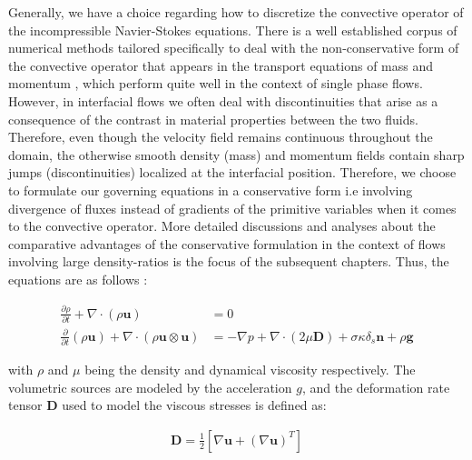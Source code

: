 Generally, we have a choice regarding how to discretize the convective operator
of the incompressible Navier-Stokes equations. There is a well established corpus of 
numerical methods tailored specifically to deal with the non-conservative 
 form of the convective 
operator that appears in the transport equations of mass and momentum 
, which perform quite well in the context of single phase flows.
However, in interfacial flows we often deal with discontinuities that arise as a consequence
of the contrast in material properties between the two fluids. Therefore, even though the velocity field
remains continuous throughout the domain, the otherwise smooth density (mass) and momentum fields 
contain sharp jumps (discontinuities) localized at the interfacial position.     
Therefore, we choose to formulate our governing equations in a conservative form i.e involving divergence of fluxes instead of gradients of the primitive variables when it comes to the convective operator. More detailed discussions and analyses about the comparative advantages of the conservative formulation in the context of flows involving large density-ratios is the focus of the subsequent chapters. Thus, the equations are as follows :  




\begin{align} 
	\frac{\partial \rho}{\partial t} + \nabla\cdot \left(\rho\boldsymbol{u}\right) &= 0 \label{mass} \\
	\frac{\partial}{\partial t} \left(\rho\boldsymbol{u}\right) + \nabla \cdot \left(\rho\boldsymbol{u}\otimes\boldsymbol{u}\right)  &= -\nabla p + \nabla \cdot \left(2 \mu \boldsymbol{D}\right) + \sigma \kappa \delta_{s}\boldsymbol{n} + \rho \boldsymbol{g}
\label{nseqn}
\end{align}


with $\rho$ and $\mu$ being the density and dynamical viscosity respectively. 
The volumetric sources are modeled by the acceleration $g$, and the 
deformation rate tensor $\boldsymbol{D}$ used to model the viscous stresses is defined as:  

\begin{align}
	\boldsymbol{D} = \frac{1}{2}\left[\nabla \boldsymbol{u} + \left(\nabla \boldsymbol{u}\right)^{T}\right]  
\end{align}


